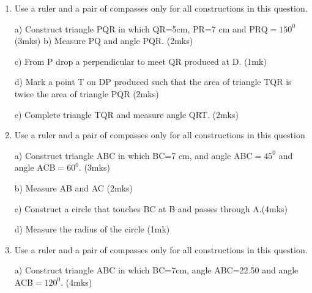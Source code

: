 \documentclass[
  a4paperpaper,
]{scrbook}
\begin{document}
\begin{tcolorbox}
\begin{enumerate}
  c) From A drop a perpendicular to meet BC produced at D.\hspace{4cm}
  (1mk)

  d) Measure AD and hence calculate the area of triangle
  ABC.\hspace{3.4cm} (2mks)

  e) Mark a point P on AD such that the area of triangle PBC is half the
  area of triangle ABC. \hspace{12.2cm} (1mk)

  f) Complete triangle PBC and measure angle PBC \hspace{5.1cm} (2mks)
\item
  Use a ruler and a pair of compasses only for all constructions in this
  question.

  a) Construct triangle PQR in which QR=5cm, PR=7 cm and PRQ\(=150^0\)
  \hspace{1.4cm}(3mks) b) Measure PQ and angle PQR. \hspace{8cm} (2mks)

  c) From P drop a perpendicular to meet QR produced at D.\hspace{3.8cm}
  (1mk)

  d) Mark a point T on DP produced such that the area of triangle TQR is
  twice the area of triangle PQR \hspace{10.8cm} (2mks)

  e) Complete triangle TQR and measure angle QRT. \hspace{5cm} (2mks)
\item
  Use a ruler and a pair of compasses only for all constructions in this
  question

  a) Construct triangle ABC in which BC=7 cm, and angle ABC\(=45^0\) and
  angle ACB\(=60^0\). \hspace{13.25cm}(3mks)

  b) Measure AB and AC \hspace{9.6cm} (2mks)

  c) Construct a circle that touches BC at B and passes through
  A.\hspace{3cm}(4mks)

  d) Measure the radius of the circle \hspace{7.8cm} (1mk)
\item
  Use a ruler and a pair of compasses only for all constructions in this
  question.

  a) Construct triangle ABC in which BC=7cm, angle ABC=22.50 and angle
  ACB\(=120^0\). \hspace{12.9cm} (4mks)


\end{enumerate}
\end{tcolorbox}
\end{document}
